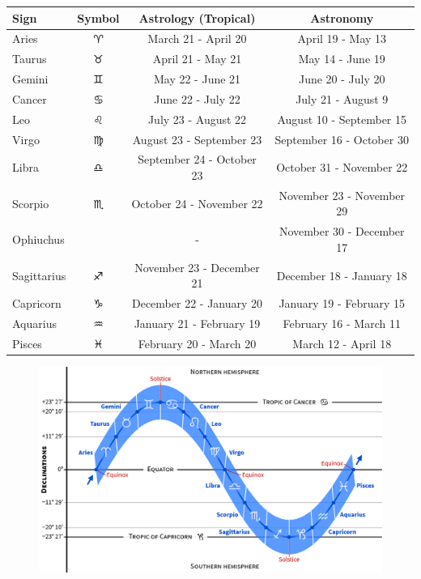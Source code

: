 \documentclass[a4paper,12pt]{extarticle}
\begin{document}
\begin{enumerate}
\begin{table}[H]
	\centering
\begin{tabular}{|l|c|c|c|}
	\hline 
	\textbf{Sign} & \textbf{Symbol} & \textbf{Astrology (Tropical)} & \textbf{Astronomy} \\ 
	\hline 
	Aries & $\aries$ & March 21 - April 20 & April 19 - May 13 \\ 
	\hline 
	Taurus & $\taurus$ & April 21 - May 21 & May 14 - June 19 \\ 
	\hline 
	Gemini & $\gemini$ & May 22 - June 21 & June 20 - July 20 \\ 
	\hline 
	Cancer & $\cancer$ & June 22 - July 22 & July 21 - August 9 \\ 
	\hline 
	Leo & $\leo$ & July 23 - August 22 & August 10 - September 15 \\ 
	\hline 
	Virgo & $\virgo$ & August 23 - September 23 & September 16 - October 30 \\ 
	\hline 
	Libra & $\libra$ & September 24 - October 23 & October 31 - November 22 \\ 
	\hline 
	Scorpio & $\scorpio$ & October 24 - November 22 & November 23 - November 29 \\ 
	\hline 
	Ophiuchus &  & - & November 30 - December 17 \\ 
	\hline 
	Sagittarius & $\sagittarius$ & November 23 - December 21 & December 18 - January 18 \\ 
	\hline 
	Capricorn & $\capricornus$ & December 22 - January 20 & January 19 - February 15 \\ 
	\hline 
	Aquarius & $\aquarius$ & January 21 - February 19 & February 16 - March 11 \\ 
	\hline 
	Pisces & $\pisces$ & February 20 - March 20 & March 12 - April 18 \\ 
	\hline 
\end{tabular}
\end{table}
	\begin{figure}[H]
		\centering
		\includegraphics[width=0.8\linewidth]{zodiac_dec.png}
	\end{figure}
	

\end{enumerate}
\end{document}
